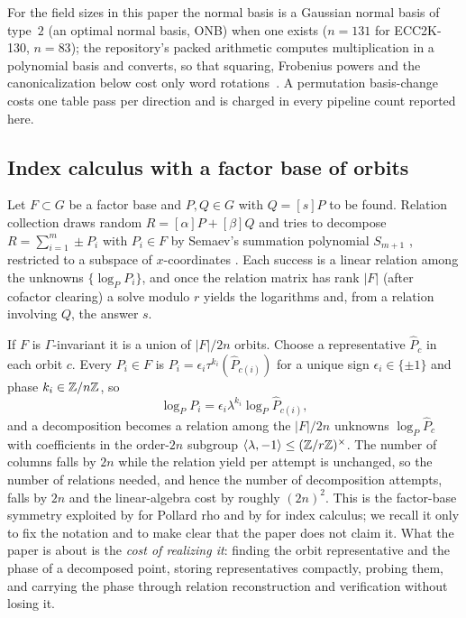 For the field sizes in this paper the normal basis is a Gaussian
normal basis of type~$2$ (an optimal normal basis, ONB) when one
exists ($n=131$ for ECC2K-130, $n=83$); the repository's packed
arithmetic computes multiplication in a polynomial basis and converts,
so that squaring, Frobenius powers and the canonicalization below cost
only word rotations~\citep{bailey2009}. A permutation basis-change costs
one table pass per direction and is charged in every pipeline count
reported here.

\subsection{Index calculus with a factor base of orbits}
\label{sec:ic-recap}

Let $F\subset G$ be a factor base and $P,Q\in G$ with $Q=[s]P$ to be
found. Relation collection draws random $R=[\alpha]P+[\beta]Q$ and
tries to decompose $R=\sum_{i=1}^m\pm P_i$ with $P_i\in F$ by
Semaev's summation polynomial $S_{m+1}$ \citep{semaev2004}, restricted
to a subspace of $x$-coordinates \citep{gaudry2009,diem2011}. Each
success is a linear relation among the unknowns
$\{\log_P P_i\}$, and once the relation matrix has rank $|F|$ (after
cofactor clearing) a solve modulo $r$ yields the logarithms and, from a
relation involving $Q$, the answer $s$.

If $F$ is $\Gamma$-invariant it is a union of $|F|/2n$ orbits. Choose a
representative $\hat P_c$ in each orbit $c$. Every $P_i\in F$ is
$P_i=\epsilon_i\tau^{k_i}(\hat P_{c(i)})$ for a unique sign
$\epsilon_i\in\{\pm1\}$ and phase $k_i\in\mathbb{Z}/n\mathbb{Z}$, so
\[
  \log_P P_i=\epsilon_i\lambda^{k_i}\log_P\hat P_{c(i)},
\]
and a decomposition becomes a relation among the $|F|/2n$ unknowns
$\log_P\hat P_c$ with coefficients in the order-$2n$ subgroup
$\langle\lambda,-1\rangle\le(\mathbb{Z}/r\mathbb{Z})^\times$. The number of columns
falls by $2n$ while the relation yield per attempt is unchanged, so the
number of relations needed, and hence the number of decomposition
attempts, falls by $2n$ and the linear-algebra cost by roughly $(2n)^2$.
This is the factor-base symmetry exploited by
\citet{wienerzuccherato1998,glv2001} for Pollard rho and by
\citet{gg2014,fghr2014} for index calculus; we
recall it only to fix the notation and to make clear that the paper
does not claim it. What the paper is about is the \emph{cost of
realizing it}: finding the orbit representative and the phase of a
decomposed point, storing representatives compactly, probing them, and
carrying the phase through relation reconstruction and verification
without losing it.
